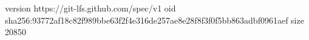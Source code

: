 version https://git-lfs.github.com/spec/v1
oid sha256:93772af18c82f989bbe63f2f4e316de257ae8e28f8f3f0f5bb863adbf0961aef
size 20850
